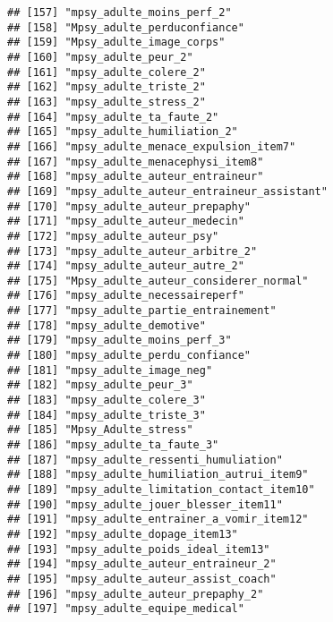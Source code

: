 \documentclass[
]{article}
\begin{document}
\begin{verbatim}
## [157] "mpsy_adulte_moins_perf_2"                            
## [158] "Mpsy_adulte_perduconfiance"                          
## [159] "Mpsy_adulte_image_corps"                             
## [160] "mpsy_adulte_peur_2"                                  
## [161] "mpsy_adulte_colere_2"                                
## [162] "mpsy_adulte_triste_2"                                
## [163] "mpsy_adulte_stress_2"                                
## [164] "mpsy_adulte_ta_faute_2"                              
## [165] "mpsy_adulte_humiliation_2"                           
## [166] "mpsy_adulte_menace_expulsion_item7"                  
## [167] "mpsy_adulte_menacephysi_item8"                       
## [168] "mpsy_adulte_auteur_entraineur"                       
## [169] "mpsy_adulte_auteur_entraineur_assistant"             
## [170] "mpsy_adulte_auteur_prepaphy"                         
## [171] "mpsy_adulte_auteur_medecin"                          
## [172] "mpsy_adulte_auteur_psy"                              
## [173] "mpsy_adulte_auteur_arbitre_2"                        
## [174] "mpsy_adulte_auteur_autre_2"                          
## [175] "Mpsy_adulte_auteur_considerer_normal"                
## [176] "mpsy_adulte_necessaireperf"                          
## [177] "mpsy_adulte_partie_entrainement"                     
## [178] "mpsy_adulte_demotive"                                
## [179] "mpsy_adulte_moins_perf_3"                            
## [180] "mpsy_adulte_perdu_confiance"                         
## [181] "mpsy_adulte_image_neg"                               
## [182] "mpsy_adulte_peur_3"                                  
## [183] "mpsy_adulte_colere_3"                                
## [184] "mpsy_adulte_triste_3"                                
## [185] "Mpsy_Adulte_stress"                                  
## [186] "mpsy_adulte_ta_faute_3"                              
## [187] "mpsy_adulte_ressenti_humuliation"                    
## [188] "mpsy_adulte_humiliation_autrui_item9"                
## [189] "mpsy_adulte_limitation_contact_item10"               
## [190] "mpsy_adulte_jouer_blesser_item11"                    
## [191] "mpsy_adulte_entrainer_a_vomir_item12"                
## [192] "mpsy_adulte_dopage_item13"                           
## [193] "mpsy_adulte_poids_ideal_item13"                      
## [194] "mpsy_adulte_auteur_entraineur_2"                     
## [195] "mpsy_adulte_auteur_assist_coach"                     
## [196] "mpsy_adulte_auteur_prepaphy_2"                       
## [197] "mpsy_adulte_equipe_medical"                          

\end{verbatim}
\end{document}
